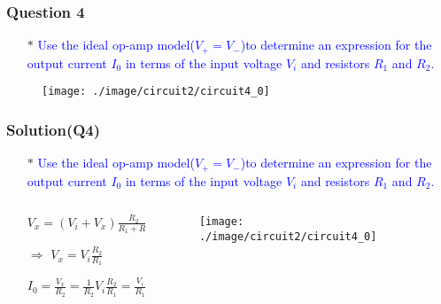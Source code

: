 \documentclass{beamer}
\newcommand{\blue}[1]{\textcolor{blue}{#1}}
\begin{document}

\begin{frame}
\frametitle{Question 4}

\begin{itemize} \itemsep1pt \parskip0pt 
  \item[$\ast$] \blue{Use the ideal op-amp model($V_+ = V_-$)to
determine an expression for the output current $I_0$
in terms of the input voltage $V_i$ and resistors $R_1$
and $R_2$.}
\end{itemize}



\begin{figure}[H]
  \centering
  \texttt{[image: ./image/circuit2/circuit4\_0]}
\end{figure}


\end{frame}


\begin{frame}
\frametitle{Solution(Q4)}

\begin{itemize} \itemsep1pt \parskip0pt 
  \item[$\ast$] \blue{Use the ideal op-amp model($V_+ = V_-$)to
determine an expression for the output current $I_0$
in terms of the input voltage $V_i$ and resistors $R_1$
and $R_2$.}
\end{itemize}


\begin{columns}
\begin{column}{6cm}
\begin{itemize} \itemsep1pt \parskip0pt 
  \item[] $V_x = (V_i + V_x)\frac{R_2}{R_1+R_2}$
  \item[$\Rightarrow$] $V_x = V_i\frac{R_2}{R_1}$ \newline
  \item[] $I_0 = \frac{V_x}{R_2} = \frac{1}{R_2}V_i\frac{R_2}{R_1} = \frac{V_i}{R_1}$
\end{itemize}
\end{column}


\begin{column}{6cm}
\begin{figure}[H]
  \centering
  \texttt{[image: ./image/circuit2/circuit4\_0]}
\end{figure}
\end{column}
\end{columns}

\end{frame}
\end{document}
